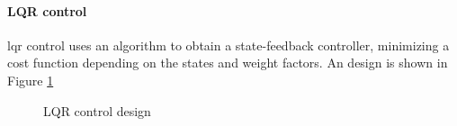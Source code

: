 \paragraph{LQR control}
\acf{lqr} control uses an algorithm to obtain a state-feedback controller, minimizing a cost function depending on the states and weight factors. 
An  design is shown in Figure \ref{fig:set.lqr}
\begin{figure}[h!]
	\centering
	\caption{LQR control design\label{fig:set.lqr}}
\end{figure}

